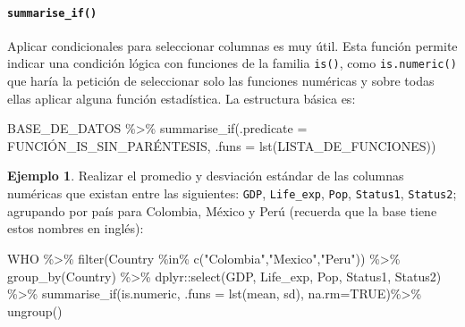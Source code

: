 \documentclass[
]{article}
\newenvironment{Shaded}{\begin{snugshade}}{\end{snugshade}}
\newcommand{\AttributeTok}[1]{\textcolor[rgb]{0.77,0.63,0.00}{#1}}
\newcommand{\ConstantTok}[1]{\textcolor[rgb]{0.00,0.00,0.00}{#1}}
\newcommand{\FunctionTok}[1]{\textcolor[rgb]{0.00,0.00,0.00}{#1}}
\newcommand{\NormalTok}[1]{#1}
\newcommand{\SpecialCharTok}[1]{\textcolor[rgb]{0.00,0.00,0.00}{#1}}
\newcommand{\StringTok}[1]{\textcolor[rgb]{0.31,0.60,0.02}{#1}}
\theoremstyle{definition}
\theoremstyle{definition}
\newtheorem{example}{Ejemplo}[section]
\theoremstyle{definition}
\theoremstyle{definition}
\theoremstyle{remark}
\begin{document}
\hypertarget{summarise_if}{%
\paragraph{\texorpdfstring{\texttt{summarise\_if()}}{summarise\_if()}}\label{summarise_if}}

Aplicar condicionales para seleccionar columnas es muy útil. Esta función permite indicar una condición lógica con funciones de la familia \texttt{is()}, como \texttt{is.numeric()} que haría la petición de seleccionar solo las funciones numéricas y sobre todas ellas aplicar alguna función estadística. La estructura básica es:

\begin{Shaded}
\begin{Highlighting}[]
\NormalTok{BASE\_DE\_DATOS }\SpecialCharTok{\%\textgreater{}\%} 
  \FunctionTok{summarise\_if}\NormalTok{(}\AttributeTok{.predicate =}\NormalTok{ FUNCIÓN\_IS\_SIN\_PARÉNTESIS,}
               \AttributeTok{.funs =} \FunctionTok{lst}\NormalTok{(LISTA\_DE\_FUNCIONES))}
\end{Highlighting}
\end{Shaded}

\begin{example}

Realizar el promedio y desviación estándar de las columnas numéricas que existan entre las siguientes: \texttt{GDP}, \texttt{Life\_exp}, \texttt{Pop}, \texttt{Status1}, \texttt{Status2}; agrupando por país para Colombia, México y Perú (recuerda que la base tiene estos nombres en inglés):

\begin{Shaded}
\begin{Highlighting}[]
\NormalTok{WHO }\SpecialCharTok{\%\textgreater{}\%} 
  \FunctionTok{filter}\NormalTok{(Country }\SpecialCharTok{\%in\%} \FunctionTok{c}\NormalTok{(}\StringTok{"Colombia"}\NormalTok{,}\StringTok{"Mexico"}\NormalTok{,}\StringTok{"Peru"}\NormalTok{)) }\SpecialCharTok{\%\textgreater{}\%} 
  \FunctionTok{group\_by}\NormalTok{(Country) }\SpecialCharTok{\%\textgreater{}\%} 
\NormalTok{  dplyr}\SpecialCharTok{::}\FunctionTok{select}\NormalTok{(GDP, Life\_exp, Pop, Status1, Status2) }\SpecialCharTok{\%\textgreater{}\%} 
  \FunctionTok{summarise\_if}\NormalTok{(is.numeric, }
               \AttributeTok{.funs =} \FunctionTok{lst}\NormalTok{(mean, sd),  }
               \AttributeTok{na.rm=}\ConstantTok{TRUE}\NormalTok{)}\SpecialCharTok{\%\textgreater{}\%} 
  \FunctionTok{ungroup}\NormalTok{()}
\end{Highlighting}
\end{Shaded}

\end{example}
\end{document}
